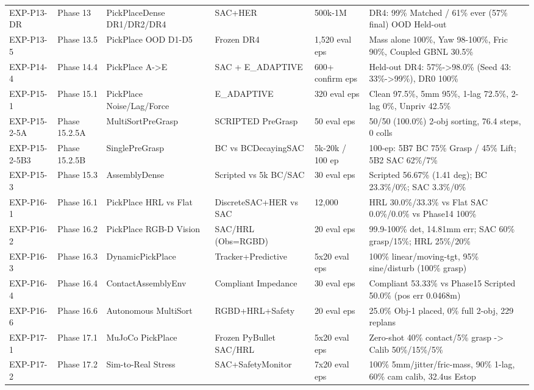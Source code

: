 \begin{longtable}{l l l l l l}
EXP-P13-DR & Phase 13 & PickPlaceDense DR1/DR2/DR4 & SAC+HER & 500k-1M & DR4: 99\% Matched / 61\% ever (57\% final) OOD Held-out \\
EXP-P13-5 & Phase 13.5 & PickPlace OOD D1-D5 & Frozen DR4 & 1,520 eval eps & Mass alone 100\%, Yaw 98-100\%, Fric 90\%, Coupled GBNL 30.5\% \\
EXP-P14-4 & Phase 14.4 & PickPlace A->E & SAC + E\_ADAPTIVE & 600+ confirm eps & Held-out DR4: 57\%->98.0\% (Seed 43: 33\%->99\%), DR0 100\% \\
EXP-P15-1 & Phase 15.1 & PickPlace Noise/Lag/Force & E\_ADAPTIVE & 320 eval eps & Clean 97.5\%, 5mm 95\%, 1-lag 72.5\%, 2-lag 0\%, Unpriv 42.5\% \\
EXP-P15-2-5A & Phase 15.2.5A & MultiSortPreGrasp & SCRIPTED PreGrasp & 50 eval eps & 50/50 (100.0\%) 2-obj sorting, 76.4 steps, 0 colls \\
EXP-P15-2-5B3 & Phase 15.2.5B & SinglePreGrasp & BC vs BCDecayingSAC & 5k-20k / 100 ep & 100-ep: 5B7 BC 75\% Grasp / 45\% Lift; 5B2 SAC 62\%/7\% \\
EXP-P15-3 & Phase 15.3 & AssemblyDense & Scripted vs 5k BC/SAC & 30 eval eps & Scripted 56.67\% (1.41 deg); BC 23.3\%/0\%; SAC 3.3\%/0\% \\
EXP-P16-1 & Phase 16.1 & PickPlace HRL vs Flat & DiscreteSAC+HER vs SAC & 12,000 & HRL 30.0\%/33.3\% vs Flat SAC 0.0\%/0.0\% vs Phase14 100\% \\
EXP-P16-2 & Phase 16.2 & PickPlace RGB-D Vision & SAC/HRL (Obs=RGBD) & 20 eval eps & 99.9-100\% det, 14.81mm err; SAC 60\% grasp/15\%; HRL 25\%/20\% \\
EXP-P16-3 & Phase 16.3 & DynamicPickPlace & Tracker+Predictive & 5x20 eval eps & 100\% linear/moving-tgt, 95\% sine/disturb (100\% grasp) \\
EXP-P16-4 & Phase 16.4 & ContactAssemblyEnv & Compliant Impedance & 30 eval eps & Compliant 53.33\% vs Phase15 Scripted 50.0\% (pos err 0.0468m) \\
EXP-P16-6 & Phase 16.6 & Autonomous MultiSort & RGBD+HRL+Safety & 20 eval eps & 25.0\% Obj-1 placed, 0\% full 2-obj, 229 replans \\
EXP-P17-1 & Phase 17.1 & MuJoCo PickPlace & Frozen PyBullet SAC/HRL & 5x20 eval eps & Zero-shot 40\% contact/5\% grasp -> Calib 50\%/15\%/5\% \\
EXP-P17-2 & Phase 17.2 & Sim-to-Real Stress & SAC+SafetyMonitor & 7x20 eval eps & 100\% 5mm/jitter/fric-mass, 90\% 1-lag, 60\% cam calib, 32.4us Estop \\
\bottomrule \end{longtable}
